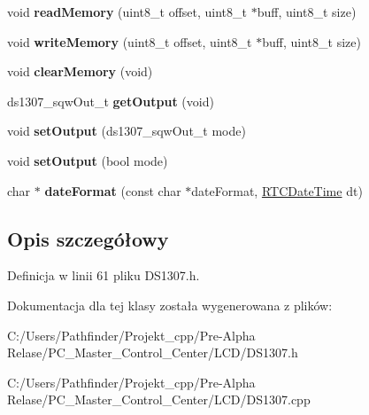 \begin{DoxyCompactItemize}
void {\bfseries read\+Memory} (uint8\+\_\+t offset, uint8\+\_\+t $\ast$buff, uint8\+\_\+t size)
\item 
\mbox{\label{class_d_s1307_ab7cc5b6d0304517ab9a080f1104539a6}} 
void {\bfseries write\+Memory} (uint8\+\_\+t offset, uint8\+\_\+t $\ast$buff, uint8\+\_\+t size)
\item 
\mbox{\label{class_d_s1307_a0180e471e904e98da268be098ce315ae}} 
void {\bfseries clear\+Memory} (void)
\item 
\mbox{\label{class_d_s1307_a1da88aa31f0809be83e906b7f4cffd6d}} 
ds1307\+\_\+sqw\+Out\+\_\+t {\bfseries get\+Output} (void)
\item 
\mbox{\label{class_d_s1307_a52652a667340e30b1b1f010041de8ffc}} 
void {\bfseries set\+Output} (ds1307\+\_\+sqw\+Out\+\_\+t mode)
\item 
\mbox{\label{class_d_s1307_ae413d40f19c971bb60f0d4d0355d1fef}} 
void {\bfseries set\+Output} (bool mode)
\item 
\mbox{\label{class_d_s1307_a6ecedf79557dd1d12cb1fd7b942f3204}} 
char $\ast$ {\bfseries date\+Format} (const char $\ast$date\+Format, \hyperlink{struct_r_t_c_date_time}{R\+T\+C\+Date\+Time} dt)
\end{DoxyCompactItemize}


\subsection{Opis szczegółowy}


Definicja w linii 61 pliku D\+S1307.\+h.



Dokumentacja dla tej klasy została wygenerowana z plików\+:\begin{DoxyCompactItemize}
\item 
C\+:/\+Users/\+Pathfinder/\+Projekt\+\_\+cpp/\+Pre-\/\+Alpha Relase/\+P\+C\+\_\+\+Master\+\_\+\+Control\+\_\+\+Center/\+L\+C\+D/D\+S1307.\+h\item 
C\+:/\+Users/\+Pathfinder/\+Projekt\+\_\+cpp/\+Pre-\/\+Alpha Relase/\+P\+C\+\_\+\+Master\+\_\+\+Control\+\_\+\+Center/\+L\+C\+D/D\+S1307.\+cpp\end{DoxyCompactItemize}
